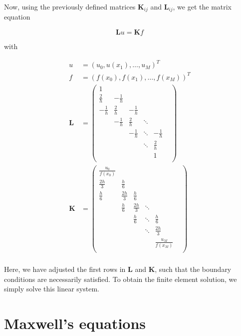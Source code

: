 \documentclass[11pt, a4paper]{article}
\begin{document}
Now, using the previously defined matrices $\mathbf{K}_{ij}$ and 
$\mathbf{L}_{ij}$, we get the matrix equation 

\begin{equation}
    \mathbf{L}u = \mathbf{K}f
\end{equation}

with 

\begin{align}
    u &= (u_0, u(x_1), \dots, u_M)^T \\
    f &= (f(x_0), f(x_1), \dots, f(x_{M}))^T \\
    \mathbf{L} &= \begin{pmatrix}
        1 & & & & \\
        \frac{2}{h} & -\frac{1}{h} & & & \\
        -\frac{1}{h} & \frac{2}{h} & -\frac{1}{h} & & \\
        & -\frac{1}{h} & \frac{2}{h} & \ddots & & \\
        & & -\frac{1}{h} & \ddots  & -\frac{1}{h} \\
        & & & \ddots & \frac{2}{h} \\
        & & & & 1 \\
    \end{pmatrix} \\
    \mathbf{K} &= \begin{pmatrix}
        \frac{u_0}{f(x_0)} & & & & \\
        \frac{2h}{3} & \frac{h}{6} & & & \\
        \frac{h}{6} & \frac{2h}{3} & \frac{h}{6} & & \\
        & \frac{h}{6} & \frac{2h}{3} & \ddots & & \\
        & & \frac{h}{6} & \ddots  & \frac{h}{6} \\
        & & & \ddots & \frac{2h}{3} \\
        & & & & \frac{u_M}{f(x_M)} \\
    \end{pmatrix} \\
\end{align}

Here, we have adjusted the first rows in $\mathbf{L}$ and $\mathbf{K}$, such that
the boundary conditions are necessarily satisfied.
To obtain the finite element solution, we simply solve this linear system.

\section{Maxwell's equations}
\label{sec:maxwell}
\end{document}
